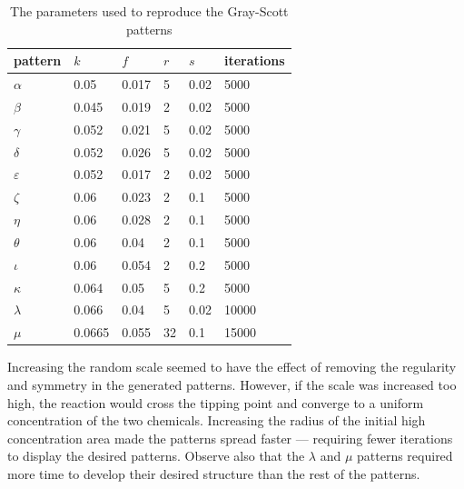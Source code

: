 \begin{table}[H]
    \centering
    \caption{The parameters used to reproduce the Gray-Scott patterns}\label{prob5:tab:parameters}
    \begin{tabular}{@{}llllll@{}}
        \toprule
        pattern       & $k$    & $f$   & $r$ & $s$  & iterations \\ \midrule
        $\alpha$      & 0.05   & 0.017 & 5   & 0.02 & 5000       \\
        $\beta$       & 0.045  & 0.019 & 2   & 0.02 & 5000       \\
        $\gamma$      & 0.052  & 0.021 & 5   & 0.02 & 5000       \\
        $\delta$      & 0.052  & 0.026 & 5   & 0.02 & 5000       \\
        $\varepsilon$ & 0.052  & 0.017 & 2   & 0.02 & 5000       \\
        $\zeta$       & 0.06   & 0.023 & 2   & 0.1  & 5000       \\
        $\eta$        & 0.06   & 0.028 & 2   & 0.1  & 5000       \\
        $\theta$      & 0.06   & 0.04  & 2   & 0.1  & 5000       \\
        $\iota$       & 0.06   & 0.054 & 2   & 0.2  & 5000       \\
        $\kappa$      & 0.064  & 0.05  & 5   & 0.2  & 5000       \\
        $\lambda$     & 0.066  & 0.04  & 5   & 0.02 & 10000      \\
        $\mu$         & 0.0665 & 0.055 & 32  & 0.1  & 15000      \\ \bottomrule
    \end{tabular}
\end{table}

Increasing the random scale seemed to have the effect of removing the regularity and symmetry in the generated patterns.
However, if the scale was increased too high, the reaction would cross the tipping point and converge to a uniform concentration of the two chemicals.
Increasing the radius of the initial high concentration area made the patterns spread faster --- requiring fewer iterations to display the desired patterns.
Observe also that the $\lambda$ and $\mu$ patterns required more time to develop their desired structure than the rest of the patterns.
